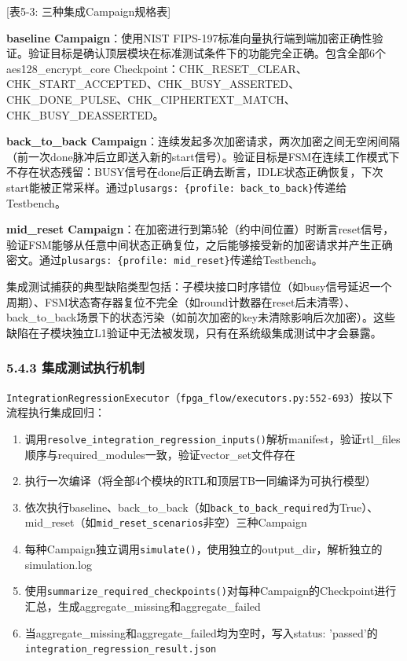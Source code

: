 {[}表5-3: 三种集成Campaign规格表{]}

\textbf{baseline Campaign}：使用NIST
FIPS-197标准向量执行端到端加密正确性验证。验证目标是确认顶层模块在标准测试条件下的功能完全正确。包含全部6个aes128\_encrypt\_core
Checkpoint：CHK\_RESET\_CLEAR、CHK\_START\_ACCEPTED、CHK\_BUSY\_ASSERTED、CHK\_DONE\_PULSE、CHK\_CIPHERTEXT\_MATCH、CHK\_BUSY\_DEASSERTED。

\textbf{back\_to\_back
Campaign}：连续发起多次加密请求，两次加密之间无空闲间隔（前一次done脉冲后立即送入新的start信号）。验证目标是FSM在连续工作模式下不存在状态残留：BUSY信号在done后正确去断言，IDLE状态正确恢复，下次start能被正常采样。通过\texttt{plusargs:\ \{profile:\ \textquotesingle{}back\_to\_back\textquotesingle{}\}}传递给Testbench。

\textbf{mid\_reset
Campaign}：在加密进行到第5轮（约中间位置）时断言reset信号，验证FSM能够从任意中间状态正确复位，之后能够接受新的加密请求并产生正确密文。通过\texttt{plusargs:\ \{profile:\ \textquotesingle{}mid\_reset\textquotesingle{}\}}传递给Testbench。

集成测试捕获的典型缺陷类型包括：子模块接口时序错位（如busy信号延迟一个周期）、FSM状态寄存器复位不完全（如round计数器在reset后未清零）、back\_to\_back场景下的状态污染（如前次加密的key未清除影响后次加密）。这些缺陷在子模块独立L1验证中无法被发现，只有在系统级集成测试中才会暴露。

\subsubsection{5.4.3
集成测试执行机制}\label{ux96c6ux6210ux6d4bux8bd5ux6267ux884cux673aux5236}

\texttt{IntegrationRegressionExecutor}（\texttt{fpga\_flow/executors.py:552-693}）按以下流程执行集成回归：

\begin{enumerate}
\def\labelenumi{\arabic{enumi}.}
\tightlist
\item
  调用\texttt{resolve\_integration\_regression\_inputs()}解析manifest，验证rtl\_files顺序与required\_modules一致，验证vector\_set文件存在
\item
  执行一次编译（将全部4个模块的RTL和顶层TB一同编译为可执行模型）
\item
  依次执行baseline、back\_to\_back（如\texttt{back\_to\_back\_required}为True）、mid\_reset（如\texttt{mid\_reset\_scenarios}非空）三种Campaign
\item
  每种Campaign独立调用\texttt{simulate()}，使用独立的output\_dir，解析独立的simulation.log
\item
  使用\texttt{summarize\_required\_checkpoints()}对每种Campaign的Checkpoint进行汇总，生成aggregate\_missing和aggregate\_failed
\item
  当aggregate\_missing和aggregate\_failed均为空时，写入status:
  'passed'的\texttt{integration\_regression\_result.json}
\end{enumerate}

